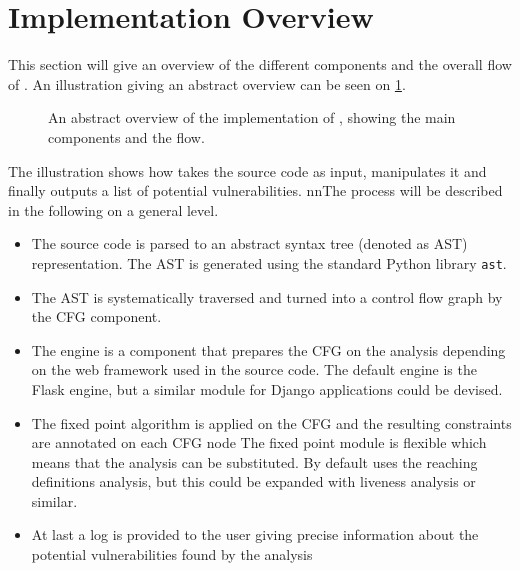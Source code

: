 \section{Implementation Overview}\label{impl:overview}
This section will give an overview of the different components and the overall flow of \pyt{}.
An illustration giving an abstract overview can be seen on \cref{figure:implementation_overview}.

\begin{figure}
  
  \caption{An abstract overview of the implementation of \pyt{}, showing the main components and the flow.}
  \label{figure:implementation_overview}
\end{figure}

The illustration shows how  \pyt{} takes the source code as input, manipulates it and finally outputs a list of potential vulnerabilities.
nnThe process will be described in the following on a general level.

\begin{itemize}
\item The source code is parsed to an abstract syntax tree (denoted as AST) representation.
  The AST is generated using the standard Python library \texttt{ast}\cite{python_ast}.
\item The AST is systematically traversed and turned into a control flow graph by the CFG component.
\item The engine is a component that prepares the CFG on the analysis depending on the web framework used in the source code.
  The default engine is the Flask engine, but a similar module for Django applications could be devised.
\item The fixed point algorithm is applied on the CFG and the resulting constraints are annotated on each CFG node
  The fixed point module is flexible which means that the analysis can be substituted.
  By default \pyt{} uses the reaching definitions analysis, but this could be expanded with liveness analysis or similar.
\item At last a log is provided to the user giving precise information about the potential vulnerabilities found by the analysis
\end{itemize}
